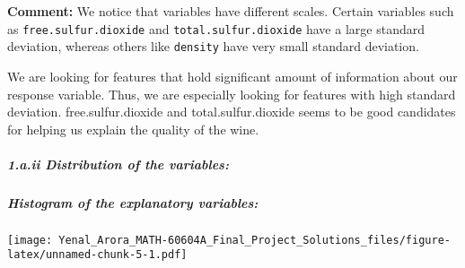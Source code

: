 \documentclass[
]{article}
\newenvironment{Shaded}{\begin{snugshade}}{\end{snugshade}}
\newcommand{\AttributeTok}[1]{\textcolor[rgb]{0.77,0.63,0.00}{#1}}
\newcommand{\CommentTok}[1]{\textcolor[rgb]{0.56,0.35,0.01}{\textit{#1}}}
\newcommand{\DecValTok}[1]{\textcolor[rgb]{0.00,0.00,0.81}{#1}}
\newcommand{\FunctionTok}[1]{\textcolor[rgb]{0.00,0.00,0.00}{#1}}
\newcommand{\NormalTok}[1]{#1}
\newcommand{\SpecialCharTok}[1]{\textcolor[rgb]{0.00,0.00,0.00}{#1}}
\newcommand{\StringTok}[1]{\textcolor[rgb]{0.31,0.60,0.02}{#1}}
\begin{document}
\textbf{Comment:} We notice that variables have different scales.
Certain variables such as \texttt{free.sulfur.dioxide} and
\texttt{total.sulfur.dioxide} have a large standard deviation, whereas
others like \texttt{density} have very small standard deviation.

We are looking for features that hold significant amount of information
about our response variable. Thus, we are especially looking for
features with high standard deviation. free.sulfur.dioxide and
total.sulfur.dioxide seems to be good candidates for helping us explain
the quality of the wine.

\hypertarget{a.ii-distribution-of-the-variables}{%
\subparagraph{1.a.ii Distribution of the
variables:}\label{a.ii-distribution-of-the-variables}}

\hypertarget{histogram-of-the-explanatory-variables}{%
\subparagraph{Histogram of the explanatory
variables:}\label{histogram-of-the-explanatory-variables}}

\begin{Shaded}
\end{Shaded}

\texttt{[image: Yenal\_Arora\_MATH-60604A\_Final\_Project\_Solutions\_files/figure-latex/unnamed-chunk-5-1.pdf]}
\end{document}

